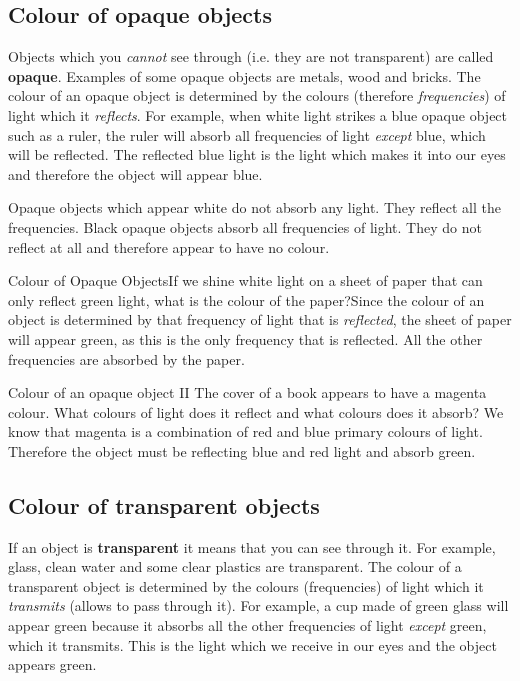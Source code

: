 \subsection{Colour of opaque objects}
Objects which you \textit{cannot} see through (i.e. they are not transparent) are called \textbf{opaque}. Examples of some opaque objects are metals, wood and bricks. The colour of an opaque object is determined by the colours (therefore \textit{frequencies}) of light which it \textit{reflects}. For example, when white light strikes a blue opaque object such as a ruler, the ruler will absorb all frequencies of light \textit{except} blue, which will be reflected. The reflected blue light is the light which makes it into our eyes and therefore the object will appear blue.

Opaque objects which appear white do not absorb any light. They reflect all the frequencies.
Black opaque objects absorb all frequencies of light. They do not reflect at all and therefore appear to have no colour.

\begin{wex}
{Colour of Opaque Objects}{If we shine white light on a sheet of paper that can only reflect green light, what is the colour of the paper?}{Since the colour of an object is determined by that frequency of light that is \textit{reflected}, the sheet of paper will appear green, as this is the only frequency that is reflected. All the other frequencies are absorbed by the paper.}
\end{wex}

\begin{wex}{Colour of an opaque object II}
{The cover of a book appears to have a magenta colour. What colours of light does it reflect and what colours does it absorb?}
{We know that magenta is a combination of red and blue primary colours of light. Therefore the object must be reflecting blue and red light and absorb green. }
\end{wex}

\subsection{Colour of transparent objects}
If an object is \textbf{transparent} it means that you can see through it. For example, glass, clean water and some clear plastics are transparent. The colour of a transparent object is determined by the colours (frequencies) of light which it \textit{transmits} (allows to pass through it). For example, a cup made of green glass will appear green because it absorbs all the other frequencies of light \textit{except} green, which it transmits. This is the light which we receive in our eyes and the object appears green. 


